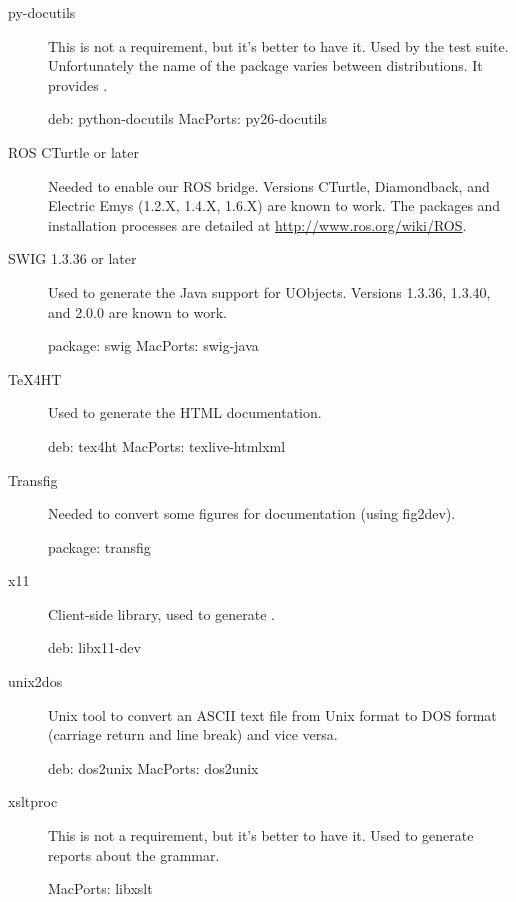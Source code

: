 \begin{description}
\item[py-docutils] This is not a requirement, but it's better to have
  it.  Used by the test suite.  Unfortunately the name of the package
  varies between distributions.  It provides .
\begin{package}
deb: python-docutils
MacPorts: py26-docutils
\end{package}

\item[ROS CTurtle or later] Needed to enable our ROS bridge.  Versions
  CTurtle, Diamondback, and Electric Emys (1.2.X, 1.4.X, 1.6.X) are known to
  work.  The packages and installation processes are detailed at
  \url{http://www.ros.org/wiki/ROS}.

\item[SWIG 1.3.36 or later] Used to generate the Java support for UObjects.
  Versions 1.3.36, 1.3.40, and 2.0.0 are known to work.
\begin{package}
package: swig
MacPorts: swig-java
\end{package}

\item[TeX4HT] Used to generate the HTML documentation.
\begin{package}
deb: tex4ht
MacPorts: texlive-htmlxml
\end{package}

\item[Transfig] Needed to convert some figures for documentation
  (using fig2dev).
\begin{package}
package: transfig
\end{package}

\item[x11] Client-side library,
  used to generate .
\begin{package}
deb: libx11-dev
\end{package}

\item[unix2dos]
  Unix tool to convert an ASCII text file from Unix format to DOS
  format (carriage return and line break) and vice versa.
\begin{package}
deb: dos2unix
MacPorts: dos2unix
\end{package}

\item[xsltproc] This is not a requirement, but it's better to have it. Used
  to generate reports about the \us grammar.
\begin{package}
MacPorts: libxslt
\end{package}
\end{description}

